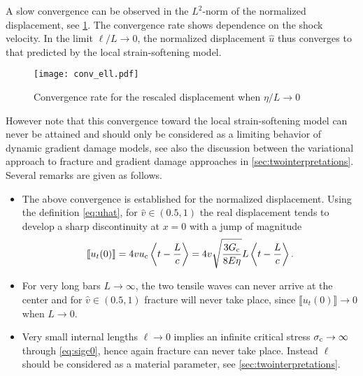 A slow convergence can be observed in the $L^2$-norm of the normalized displacement, see \cref{fig:conv_ell}. The convergence rate shows dependence on the shock velocity. In the limit $\ell/L\to 0$, the normalized displacement $\widehat{u}$ thus converges to that predicted by the local strain-softening model.
\begin{figure}[htbp]
\centering
\texttt{[image: conv\_ell.pdf]}
\caption{Convergence rate for the rescaled displacement when $\eta/L\to 0$} \label{fig:conv_ell}
\end{figure}

However note that this convergence toward the local strain-softening model can never be attained and should only be considered as a limiting behavior of dynamic gradient damage models, see also the discussion between the variational approach to fracture and gradient damage approaches in \cref{sec:twointerpretations}. Several remarks are given as follows.
\begin{itemize}
\item The above convergence is established for the normalized displacement. Using the definition \eqref{eq:uhat}, for $\widehat{v}\in(0.5,1)$ the real displacement tends to develop a sharp discontinuity at $x=0$ with a jump of magnitude
\[
\llbracket u_t(0)\rrbracket=4vu_{\mathrm{c}}\Braket{t-\frac{L}{c}}=4v\sqrt{\frac{3G_\mathrm{c}}{8E\eta}}L\Braket{t-\frac{L}{c}}.
\]

\item For very long bars $L\to\infty$, the two tensile waves can never arrive at the center and for $\widehat{v}\in(0.5,1)$ fracture will never take place, since $\llbracket u_t(0)\rrbracket\to 0$ when $L\to 0$.

\item Very small internal lengths $\ell\to 0$ implies an infinite critical stress $\sigma_{\mathrm{c}}\to\infty$ through \eqref{eq:sigc0}, hence again fracture can never take place. Instead $\ell$ should be considered as a material parameter, see \cref{sec:twointerpretations}.
\end{itemize}

